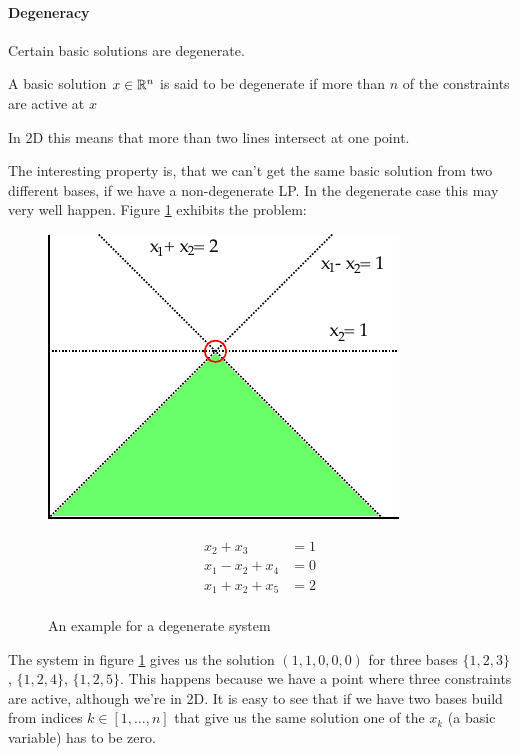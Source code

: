 \paragraph*{Degeneracy}
Certain basic solutions are degenerate. 
\begin{Def}[Degeneracy]
 A basic solution $x\in \mathbb{R}^n$ is said to be degenerate if more than $n$ of the constraints are active at $x$ 
\end{Def}
In 2D this means that more than two lines intersect at one point.

The interesting property is, that we can't get the same basic solution from two different bases, if we have a non-degenerate LP. In the degenerate case this may very well happen. Figure \ref{Fig:degenerateSystem} exhibits the problem:


\begin{figure}[hbt]
\begin{minipage}[hbt]{0.4\linewidth}
\includegraphics{./images/degenerateSystem.pdf}
\end{minipage}
\hfill
\begin{minipage}[hbt]{0.4\linewidth}
\begin{align*}
x_2 + x_3 &= 1\\
x_1 - x_2 +x_4 &=0\\
x_1 + x_2 +x_5 &= 2\\
\end{align*}
\end{minipage}
\caption{An example for a degenerate system}
\label{Fig:degenerateSystem}
\end{figure}

The system in figure \ref{Fig:degenerateSystem} gives us the solution $(1,1,0,0,0)$ for three bases $\{1,2,3\}$, $\{1,2,4\}$, $\{1,2,5\}$. This happens because we have a point where three constraints are active, although we're in 2D. It is easy to see that if we have two bases build from indices $k\in [1,\ldots,n]$ that give us the same solution one of the $x_k$ (a basic variable) has to be zero. %

